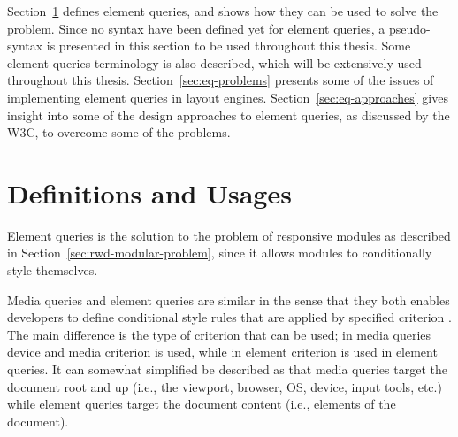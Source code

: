 \documentclass[a4paper,11pt]{kth-mag}
\begin{document}
    Section~\ref{sec:eq-definitions} defines element queries, and shows how they can be used to solve the problem.
    Since no syntax have been defined yet for element queries, a pseudo-syntax is presented in this section to be used throughout this thesis.
    Some element queries terminology is also described, which will be extensively used throughout this thesis.
    Section~\ref{sec:eq-problems} presents some of the issues of implementing element queries  in layout engines.
    Section~\ref{sec:eq-approaches} gives insight into some of the design approaches to element queries, as discussed by the W3C, to overcome some of the problems.

    \section{Definitions and Usages}\label{sec:eq-definitions}
      \noindent
      Element queries is the solution to the problem of responsive modules as described in Section~\ref{sec:rwd-modular-problem}, since it allows modules to conditionally style themselves.

      Media queries and element queries are similar in the sense that they both enables developers to define conditional style rules that are applied by specified criterion \cite{w3c_css_mq}.
      The main difference is the type of criterion that can be used; in media queries device and media criterion is used, while in element criterion is used in element queries.
      It can somewhat simplified be described as that media queries target the document root and up (i.e., the viewport, browser, OS, device, input tools, etc.) while element queries target the document content (i.e., elements of the document).
\end{document}
